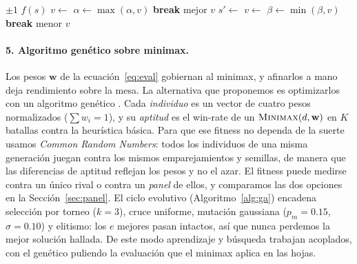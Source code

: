 \documentclass[11pt]{article}
\begin{document}
\begin{algorithm}[t]
\caption{Minimax con poda alfa-beta (paranoid)}
\label{alg:minimax}
\small
\begin{algorithmic}[1]
   \Return $\pm 1$ \EndIf
   \Return $f(s)$  \EndIf
   
      \State $v\gets$ 
      \State $\alpha\gets\max(\alpha,v)$
      \If{$\beta\le\alpha$} \textbf{break}  \EndIf
    \EndFor
    \State \Return mejor $v$
  \Else {}
      \State $s'\gets$ 
      \State $v\gets$ 
      \State $\beta\gets\min(\beta,v)$
      \If{$\beta\le\alpha$} \textbf{break}  \EndIf
    \EndFor
    \State \Return menor $v$
  \EndIf
\EndFunction
\end{algorithmic}
\end{algorithm}

\paragraph{5. Algoritmo genético sobre minimax.} Los pesos $\mathbf{w}$ de la
ecuación~\eqref{eq:eval} gobiernan al minimax, y afinarlos a mano deja rendimiento
sobre la mesa. La alternativa que proponemos es optimizarlos con un algoritmo
genético \citep{holland1992,goldberg1989}. Cada \emph{individuo} es un vector de
cuatro pesos normalizados ($\sum w_i=1$), y su \emph{aptitud} es el win-rate de un
$\textsc{Minimax}(d,\mathbf{w})$ en $K$ batallas contra la heurística básica. Para
que ese fitness no dependa de la suerte usamos \emph{Common Random Numbers}: todos
los individuos de una misma generación juegan contra los mismos emparejamientos y
semillas, de manera que las diferencias de aptitud reflejan los pesos y no el azar.
El fitness puede medirse contra un único rival o contra un \emph{panel} de ellos, y
comparamos las dos opciones en la Sección~\ref{sec:panel}. El ciclo evolutivo
(Algoritmo~\ref{alg:ga}) encadena selección por torneo ($k=3$), cruce uniforme,
mutación gaussiana ($p_m=0.15$, $\sigma=0.10$) y elitismo: los $e$ mejores pasan
intactos, así que nunca perdemos la mejor solución hallada. De este modo
aprendizaje y búsqueda trabajan acoplados, con el genético puliendo la evaluación
que el minimax aplica en las hojas.
\end{document}
